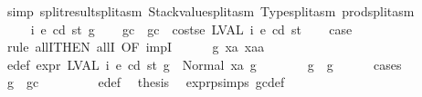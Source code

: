 \begin{isabellebody}
\ {\isacharparenleft}{\kern0pt}simp\ split{\isacharcolon}{\kern0pt}result{\isachardot}{\kern0pt}split{\isacharunderscore}{\kern0pt}asm\ Stackvalue{\isachardot}{\kern0pt}split{\isacharunderscore}{\kern0pt}asm\ Type{\isachardot}{\kern0pt}split{\isacharunderscore}{\kern0pt}asm\ prod{\isachardot}{\kern0pt}split{\isacharunderscore}{\kern0pt}asm{\isacharparenright}{\kern0pt}\isanewline
\ \ \ \ \isamarkupfalse%
\isanewline
\ \ \isamarkupfalse%
\isanewline
{}\isamarkupfalse%
\isanewline
\ \ \isamarkupfalse%
\ {\isacharparenleft}{\kern0pt}{}{}\ i\ e\ cd\ st\ g{\isacharparenright}{\kern0pt}\isanewline
\ \ \isamarkupfalse%
\ gc\ \ {\isachardoublequoteopen}gc\ {\isacharequal}{\kern0pt}\ costs\isactrlsub e\ {\isacharparenleft}{\kern0pt}LVAL\ i{\isacharparenright}{\kern0pt}\ e\ cd\ st{\isachardoublequoteclose}\isanewline
\ \ \isamarkupfalse%
\ {\isacharquery}{\kern0pt}case\isanewline
\ \ \isamarkupfalse%
\ {\isacharparenleft}{\kern0pt}rule\ allI{\isacharbrackleft}{\kern0pt}THEN\ allI{\isacharcomma}{\kern0pt}\ OF\ impI{\isacharbrackright}{\kern0pt}{\isacharparenright}{\kern0pt}\isanewline
\ \ \ \ \isamarkupfalse%
\ g{}\ xa\ xaa\ \isamarkupfalse%
\ e{\isacharunderscore}{\kern0pt}def{\isacharcolon}{\kern0pt}\ {\isachardoublequoteopen}expr\ {\isacharparenleft}{\kern0pt}LVAL\ i{\isacharparenright}{\kern0pt}\ e\ cd\ st\ g\ {\isacharequal}{\kern0pt}\ Normal\ {\isacharparenleft}{\kern0pt}xa{\isacharcomma}{\kern0pt}\ g{}{\isacharparenright}{\kern0pt}{\isachardoublequoteclose}\isanewline
\ \ \ \ \isamarkupfalse%
\ \isamarkupfalse%
\ {\isachardoublequoteopen}g{}\ {\isasymle}\ g{\isachardoublequoteclose}\isanewline
\ \ \ \ \isamarkupfalse%
\ {\isacharparenleft}{\kern0pt}cases{\isacharparenright}{\kern0pt}\isanewline
\ \ \ \ \ \ \isamarkupfalse%
\ {\isachardoublequoteopen}g\ {\isasymle}\ gc{\isachardoublequoteclose}\isanewline
\ \ \ \ \ \ \isamarkupfalse%
\ {}{}{\isacharparenleft}{\kern0pt}{}{\isacharparenright}{\kern0pt}\ e{\isacharunderscore}{\kern0pt}def\ \isamarkupfalse%
\ {\isacharquery}{\kern0pt}thesis\ \isamarkupfalse%
\ expr{\isachardot}{\kern0pt}psimps{\isacharparenleft}{\kern0pt}{}{}{\isacharparenright}{\kern0pt}\ gc{\isacharunderscore}{\kern0pt}def\ \isamarkupfalse%

\end{isabellebody}

